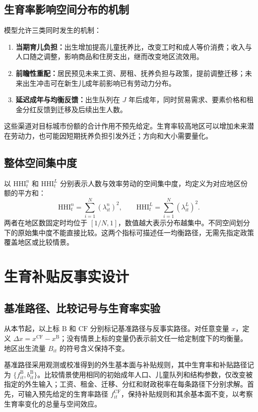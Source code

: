 \documentclass[UTF8,a4paper,zihao=-4,fontset=windows]{ctexart}
\numberwithin{equation}{section}
\newcommand{\B}{\mathrm B}
\newcommand{\CF}{\mathrm{CF}}
\begin{document}
\subsection{生育率影响空间分布的机制}
模型允许三类同时发生的机制：
\begin{enumerate}
  \item \textbf{当期育儿负担：}出生增加提高儿童抚养比，改变工时和成人等价消费；收入与人口随之调整，影响商品和住房支出，继而改变地区流效用。
  \item \textbf{前瞻性重配：}居民预见未来工资、房租、抚养负担与政策，提前调整迁移；未来出生冲击可在新生儿成年前影响已有劳动力分布。
  \item \textbf{延迟成年与均衡反馈：}出生队列在 $J$ 年后成年，同时贸易需求、要素价格和租金分红反馈到迁移及后续出生人数。
\end{enumerate}
这些渠道对目标城市份额的合计作用不预先给定。生育率较高地区可以增加未来潜在劳动力，也可能因短期抚养负担引发外迁；方向和大小需要量化。

\subsection{整体空间集中度}
以 $\mathrm{HHI}^n_t$ 和 $\mathrm{HHI}^L_t$ 分别表示人数与效率劳动的空间集中度，均定义为对应地区份额的平方和：
\begin{equation}
  \mathrm{HHI}^n_t=\sum_{i=1}^N(\lambda^n_{it})^2,\qquad
  \mathrm{HHI}^L_t=\sum_{i=1}^N(\lambda^L_{it})^2.
  \label{eq:spatial-concentration}
\end{equation}
两者在地区数固定时均位于 $[1/N,1]$，数值越大表示分布越集中。不同空间划分下的原始集中度不能直接比较。这两个指标可描述任一均衡路径，无需先指定政策覆盖地区或比较情景。

\section{生育补贴反事实设计}
\label{sec:counterfactuals}

\subsection{基准路径、比较记号与生育率实验}
\label{sec:scenario-notation}
从本节起，以上标 $\B$ 和 $\CF$ 分别标记基准路径与反事实路径。对任意变量 $x$，定义 $\Delta x=x^{\CF}-x^{\B}$；没有情景上标的变量仍表示前文任一给定制度下的均衡量。地区出生流量 $B_{it}$ 的符号含义保持不变。

基准路径采用观测或校准得到的外生基本面与补贴规则，其中生育率和补贴路径记为 $\{f^\B_{it},b^\B_{it}\}$。比较情景使用相同的初始成年人口、儿童队列和结构参数，仅改变被指定的外生输入；工资、租金、迁移、分红和财政税率在每条路径下分别求解。首先，可输入预先给定的生育率路径 $f^{\CF}_{it}$，保持补贴规则和其余基本面不变，以考察生育率变化的总量与空间效应。
\end{document}
